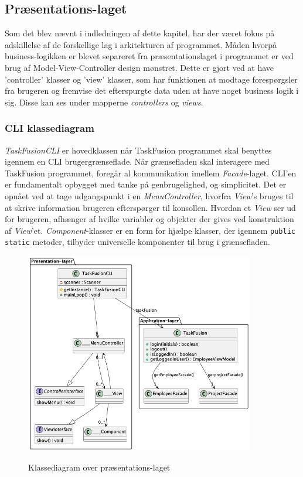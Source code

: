 \subsection{Præsentations-laget}
\noindent Som det blev nævnt i indledningen af dette kapitel, har der været fokus på adskillelse af de forskellige lag i arkitekturen af programmet. Måden hvorpå business-logikken er blevet separeret fra præsentationslaget i programmet er ved brug af Model-View-Controller design mønstret. Dette er gjort ved at have ’controller’ klasser og ’view’ klasser, som har funktionen at modtage forespørgsler fra brugeren og fremvise det efterspurgte data uden at have noget business logik i sig. Disse kan ses under mapperne \textit{controllers} og \textit{views}.

\subsubsection{CLI klassediagram}
\textit{TaskFusionCLI} er hovedklassen når TaskFusion programmet skal benyttes igennem en CLI brugergrænseflade. Når grænsefladen skal interagere med TaskFusion programmet, foregår al kommunikation imellem \textit{Facade}-laget. CLI'en er fundamentalt opbygget med tanke på genbrugelighed, og simplicitet. Det er opnået ved at tage udgangspunkt i en \textit{MenuController}, hvorfra \textit{View}'s bruges til at skrive information brugeren efterspørger til konsollen. Hvordan et \textit{View} ser ud for brugeren, afhænger af hvilke variabler og objekter der gives ved konstruktion af \textit{View}'et. \textit{Component}-klasser er en form for hjælpe klasser, der igennem \texttt{public static} metoder, tilbyder universelle komponenter til brug i grænsefladen.

\begin{figure}[H]
    \centering
    \caption{Klassediagram over præsentations-laget}
    \includegraphics[width = 10cm, keepaspectratio]{TaskFusion/out/assets/diagrams/class_cli/TaskFusion-CLI.png}
    \label{fig:class_cli}
\end{figure}

